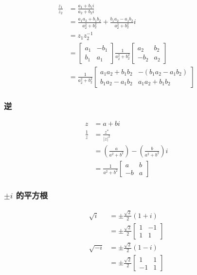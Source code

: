 $$
\begin{aligned}
\frac{z_{1}}{z_{2}} & =\frac{a_{1}+b_{1} i}{a_{2}+b_{2} i} \\
& =\frac{a_{1} a_{2}+b_{1} b_{2}}{a_{2}^{2}+b_{2}^{2}}+\frac{b_{1} a_{2}-a_{1} b_{2}}{a_{2}^{2}+b_{2}^{2}} i \\
& =z_{1} z_{2}^{-1} \\
& =\left[\begin{array}{cc}
a_{1} & -b_{1} \\
b_{1} & a_{1}
\end{array}\right] \frac{1}{a_{2}^{2}+b_{2}^{2}}\left[\begin{array}{cc}
a_{2} & b_{2} \\
-b_{2} & a_{2}
\end{array}\right] \\
& =\frac{1}{a_{2}^{2}+b_{2}^{2}}\left[\begin{array}{cc}
a_{1} a_{2}+b_{1} b_{2} & -\left(b_{1} a_{2}-a_{1} b_{2}\right) \\
b_{1} a_{2}-a_{1} b_{2} & a_{1} a_{2}+b_{1} b_{2}
\end{array}\right]
\end{aligned}
$$

\subsubsection*{逆}
$$
\begin{aligned}
z & =a+b i \\
\frac{1}{z} & =\frac{z^{*}}{|z|^{2}} \\
& =\left(\frac{a}{a^{2}+b^{2}}\right)-\left(\frac{b}{a^{2}+b^{2}}\right) i \\
& =\frac{1}{a^{2}+b^{2}}\left[\begin{array}{cc}
a & b \\
-b & a
\end{array}\right]
\end{aligned}
$$

\subsubsection*{$\pm i$ 的平方根}
$$
\begin{aligned}
\sqrt{i} & =\pm \frac{\sqrt{2}}{2}(1+i) \\
& =\pm \frac{\sqrt{2}}{2}\left[\begin{array}{cc}
1 & -1 \\
1 & 1
\end{array}\right] \\
\sqrt{-i} & =\pm \frac{\sqrt{2}}{2}(1-i) \\
& =\pm \frac{\sqrt{2}}{2}\left[\begin{array}{cc}
1 & 1 \\
-1 & 1
\end{array}\right]
\end{aligned}
$$

